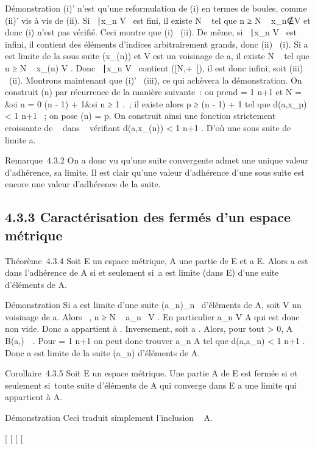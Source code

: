\documentclass[]{article}
\begin{document}
Démonstration (i)' n'est qu'une reformulation de (i) en termes de
boules, comme (ii)' vis à vis de (ii). Si \n \in
{}~∣x_n \in V \ est
fini, il existe N \in {}~ tel que n ≥ N \rigtharrow~
x_n∉V et donc (i) n'est pas vérifié.
Ceci montre que (i) \rigtharrow~(ii). De même, si \n \in
{}~∣x_n \in V \ est
infini, il contient des éléments d'indices arbitrairement grands, donc
(ii) \rigtharrow~(i). Si a est limite de la sous suite (x_\phi(n)) et V est
un voisinage de a, il existe N \in {}~ tel que n ≥ N \rigtharrow~ x_\phi(n) \in V .
Donc \n \in {}~∣x_n \in V
\ contient \phi([N,+\infty~[), il est donc infini, soit
(iii) \rigtharrow~(ii). Montrons maintenant que (i)' \rigtharrow~(iii), ce qui achèvera la
démonstration. On construit \phi(n) par récurrence de la manière suivante~:
on prend \epsilon = 1 \over n+1 et N = \left
\  &si n = 0
\cr \phi(n - 1) + 1&si n ≥ 1 \cr 
\right .~; il existe alors p ≥ \phi(n - 1) + 1 tel que
d(a,x_p) < 1 \over n+1 ~; on pose
\phi(n) = p. On construit ainsi une fonction strictement croissante de ~
dans ~ vérifiant d(a,x_\phi(n)) < 1
\over n+1 . D'où une sous suite de limite a.

Remarque~4.3.2 On a donc vu qu'une suite convergente admet une unique
valeur d'adhérence, sa limite. Il est clair qu'une valeur d'adhérence
d'une sous suite est encore une valeur d'adhérence de la suite.

\subsection{4.3.3 Caractérisation des fermés d'un espace métrique}

Théorème~4.3.4 Soit E un espace métrique, A une partie de E et a \in E.
Alors a est dans l'adhérence de A si et seulement si~a est limite (dans
E) d'une suite d'éléments de A.

Démonstration Si a est limite d'une suite (a_n)_n\in{}~
d'éléments de A, soit V un voisinage de a. Alors
\existsN \in {}~, n ≥ N \rigtharrow~ a_n~ \in V . En
particulier a_n \in V \bigcap A qui est donc non vide. Donc a
appartient à \overlineA. Inversement, soit a
\in\overlineA. Alors, pour tout \epsilon > 0, A \bigcap
B(a,\epsilon)\neq~\varnothing~. Pour \epsilon = 1 \over
n+1 on peut donc trouver a_n \in A tel que d(a,a_n)
< 1 \over n+1 . Donc a est limite de la
suite (a_n) d'éléments de A.

Corollaire~4.3.5 Soit E un espace métrique. Une partie A de E est fermée
si et seulement si~toute suite d'éléments de A qui converge dans E a une
limite qui appartient à A.

Démonstration Ceci traduit simplement l'inclusion
\overlineA \subset~ A.

[
[
[
[
\end{document}
